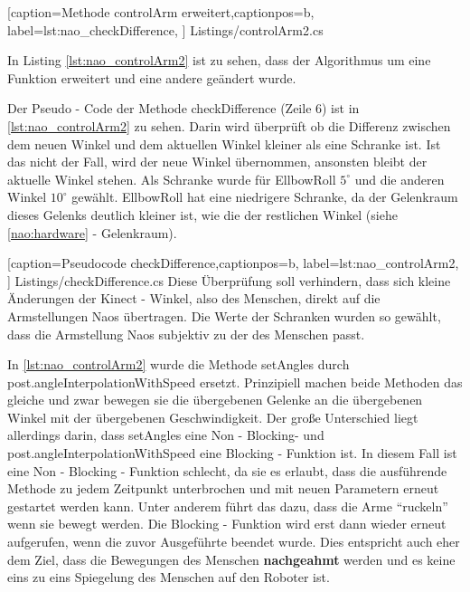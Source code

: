 
    [caption={Methode \textsf{controlArm erweitert}},captionpos=b,
       label=lst:nao_checkDifference,
       ]	
 {Listings/controlArm2.cs}

In Listing \ref{lst:nao_controlArm2} ist zu sehen, dass der Algorithmus um eine Funktion erweitert und eine andere geändert wurde.

Der Pseudo - Code der Methode \textsf{checkDifference} (Zeile 6) ist in \ref{lst:nao_controlArm2} zu sehen. Darin wird überprüft ob die Differenz zwischen dem neuen Winkel und dem aktuellen Winkel kleiner als eine Schranke ist. Ist das nicht der Fall, wird der neue Winkel übernommen, ansonsten bleibt der aktuelle Winkel stehen. 
Als Schranke wurde für EllbowRoll $5^\circ$ und die anderen Winkel $10^\circ$ gewählt. EllbowRoll hat eine niedrigere Schranke, da der Gelenkraum dieses Gelenks deutlich kleiner ist, wie die der restlichen Winkel (siehe \ref{nao:hardware} - Gelenkraum). 

    [caption={Pseudocode \textsf{checkDifference}},captionpos=b,
       label=lst:nao_controlArm2,
       ]	
 {Listings/checkDifference.cs}
Diese Überprüfung soll verhindern, dass sich kleine Änderungen der Kinect - Winkel, also des Menschen, direkt auf die Armstellungen Naos übertragen. Die Werte der Schranken wurden so gewählt, dass die Armstellung Naos subjektiv zu der des Menschen passt.


In \ref{lst:nao_controlArm2} wurde die Methode \textsf{setAngles} durch \textsf{post.angleInterpolationWithSpeed} ersetzt. Prinzipiell machen beide Methoden das gleiche und zwar bewegen sie die übergebenen Gelenke an die übergebenen Winkel mit der übergebenen Geschwindigkeit. Der große Unterschied liegt allerdings darin, dass \textsf{setAngles} eine Non - Blocking- und \textsf{post.angleInterpolationWithSpeed} eine Blocking - Funktion ist. In diesem Fall ist eine Non - Blocking - Funktion schlecht, da sie es erlaubt, dass die ausführende Methode zu jedem Zeitpunkt unterbrochen  und mit neuen Parametern erneut gestartet werden kann. Unter anderem führt das dazu, dass die Arme "`ruckeln"' wenn sie bewegt werden. Die Blocking - Funktion wird erst dann wieder erneut aufgerufen, wenn die zuvor Ausgeführte beendet wurde. Dies entspricht auch eher dem Ziel, dass die Bewegungen des Menschen \textbf{nachgeahmt} werden und es keine eins zu eins Spiegelung des Menschen auf den Roboter ist.

 
